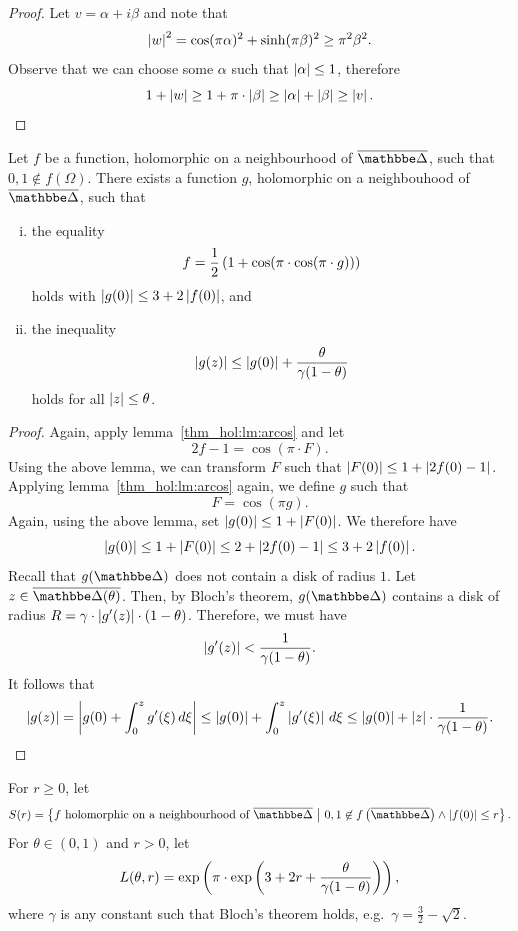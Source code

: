 \begin{proof}
Let $v = \alpha + i \beta$ and note that
\[
\left\lvert w\right\rvert^2 =
\cos(\pi \alpha)^2 + \sinh(\pi \beta)^2 \geq
\pi^2 \beta^2.
\]
Observe that we can choose some $\alpha$ such that
$\left\lvert \alpha\right\rvert \leq 1$, therefore
\[
1 + \left\lvert w\right\rvert \geq
1 + \pi \cdot \left\lvert \beta\right\rvert \geq
\left\lvert \alpha\right\rvert + \left\lvert \beta\right\rvert \geq
\left\lvert v\right\rvert. \qedhere
\]
\end{proof}

\begin{izrek}
Let $f$ be a function, holomorphic on a neighbourhood of
$\oline{\dsk}$, such that $0, 1 \not \in f(\Omega)$. There exists a
function $g$, holomorphic on a neighbouhood of $\oline{\dsk}$, such
that

\begin{enumerate}[i)]
\item the equality
\[
f = \frac{1}{2} \left(1 + \cos(\pi \cdot \cos(\pi \cdot g))\right)
\]
holds with $\left\lvert g(0)\right\rvert \leq 3 + 2 \left\lvert f(0)\right\rvert$, and
\item the inequality
\[
\left\lvert g(z)\right\rvert \leq \left\lvert g(0)\right\rvert + \frac{\theta}{\gamma (1 - \theta)}
\]
holds for all $\left\lvert z\right\rvert \leq \theta$.
\end{enumerate}
\end{izrek}

\begin{proof}
Again, apply lemma~\ref{thm_hol:lm:arcos} and let
\[
2f - 1 = \cos(\pi \cdot F).
\]
Using the above lemma, we can transform $F$ such that
$\left\lvert F(0)\right\rvert \leq 1 + \left\lvert 2f(0) - 1\right\rvert$. Applying
lemma~\ref{thm_hol:lm:arcos} again, we define $g$ such that
\[
F = \cos(\pi g).
\]
Again, using the above lemma, set $\left\lvert g(0)\right\rvert \leq 1 + \left\lvert F(0)\right\rvert$.
We therefore have
\[
\left\lvert g(0)\right\rvert \leq
1 + \left\lvert F(0)\right\rvert \leq
2 + \left\lvert 2f(0) - 1\right\rvert \leq
3 + 2 \left\lvert f(0)\right\rvert.
\]
Recall that $g(\dsk)$ does not contain a disk of radius $1$. Let
$z \in \oline{\dsk(\theta)}$. Then, by Bloch's theorem, $g(\dsk)$
contains a disk of radius
$R = \gamma \cdot \left\lvert g'(z)\right\rvert \cdot (1 - \theta)$. Therefore, we
must have
\[
\left\lvert g'(z)\right\rvert < \frac{1}{\gamma (1 - \theta)}.
\]
It follows that
\[
\left\lvert g(z)\right\rvert =
\left\lvert g(0) + \int_0^z g'(\xi)\,d\xi\right\rvert \leq
\left\lvert g(0)\right\rvert + \int_0^z \left\lvert g'(\xi)\right\rvert\,d\xi \leq
\left\lvert g(0)\right\rvert + \left\lvert z\right\rvert \cdot \frac{1}{\gamma (1 - \theta)}. \qedhere
\]
\end{proof}

\begin{definicija}
For $r \geq 0$, let
\[
S(r) =
\setb{\text{$f$ holomorphic on a neighbourhood of $\oline{\dsk}$}}
{0, 1 \not \in f \br{\oline{\dsk}} \land \abs{f(0)} \leq r}.
\]
For $\theta \in (0, 1)$ and $r > 0$, let
\[
L(\theta, r) =
\exp \left(\pi \cdot
\exp \left(3 + 2r + \frac{\theta}{\gamma (1 - \theta)}\right)\right),
\]
where $\gamma$ is any constant such that Bloch's theorem holds,
e.g.~$\gamma = \frac{3}{2} - \sqrt{2}$.
\end{definicija}

